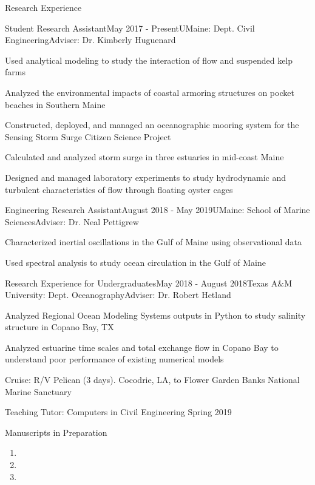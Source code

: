\documentclass{resume} %
\begin{document}
\begin{rSection}{Research Experience}
\begin{rSubsection}{Student Research Assistant}{May 2017 - Present}{UMaine: Dept. Civil Engineering}{Adviser: Dr. Kimberly Huguenard} 
\item Used analytical modeling to study the interaction of flow and suspended kelp farms  
\item Analyzed the environmental impacts of coastal armoring structures on pocket beaches in Southern Maine
\item Constructed, deployed, and managed an oceanographic mooring system for the Sensing Storm Surge Citizen Science Project
\item Calculated and analyzed storm surge in three estuaries in mid-coast Maine
\item Designed and managed laboratory experiments to study hydrodynamic and turbulent characteristics of flow through floating oyster cages
\end{rSubsection}

\begin{rSubsection}{Engineering Research Assistant}{August 2018 - May 2019}{UMaine: School of Marine Sciences}{Adviser: Dr. Neal Pettigrew}
\item Characterized inertial oscillations in the Gulf of Maine using observational data
\item Used spectral analysis to study ocean circulation in the Gulf of Maine
\end{rSubsection}

\begin{rSubsection}{Research Experience for Undergraduates}{May 2018 - August 2018}{Texas A$\&$M University: Dept. Oceanography}{Adviser: Dr. Robert Hetland} 
\item Analyzed Regional Ocean Modeling Systems outputs in Python to study salinity structure in Copano Bay, TX
\item Analyzed estuarine time scales and total exchange flow in Copano Bay to understand poor performance of existing numerical models
\item Cruise: R/V Pelican (3 days). Cocodrie, LA, to Flower Garden Banks National Marine Sanctuary 
\end{rSubsection} 
\end{rSection} 
\vspace{-3pt}
\begin{rSection}{Teaching}
Tutor: Computers in Civil Engineering \hfill Spring 2019 \\
\end{rSection}
\vspace{-10pt}
\begin{rSection} {Manuscripts in Preparation} \itemsep -3pt
\begin{enumerate}
    \item {}
    \item {}
    \item {}
\end{enumerate}    
\end{rSection}
\end{document}
